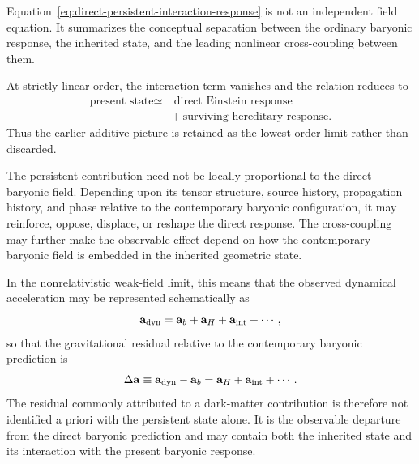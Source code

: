 Equation~\eqref{eq:direct-persistent-interaction-response} is not an independent
field equation. It summarizes the conceptual separation between the ordinary
baryonic response, the inherited state, and the leading nonlinear cross-coupling
between them.

At strictly linear order, the interaction term vanishes and the relation reduces
to
\begin{equation}
\begin{aligned}
    \text{present state}
    \simeq{}&\ \text{direct Einstein response}
    \\
    &+\ \text{surviving hereditary response}.
\end{aligned}
    \label{eq:linear-direct-plus-persistent-response}
\end{equation}
Thus the earlier additive picture is retained as the lowest-order limit rather
than discarded.

The persistent contribution need not be locally proportional to the direct
baryonic field. Depending upon its tensor structure, source history, propagation
history, and phase relative to the contemporary baryonic configuration, it may
reinforce, oppose, displace, or reshape the direct response. The cross-coupling
may further make the observable effect depend on how the contemporary baryonic
field is embedded in the inherited geometric state.

In the nonrelativistic weak-field limit, this means that the observed dynamical
acceleration may be represented schematically as
\begin{equation}
    \mathbf{a}_{\rm dyn}
    =
    \mathbf{a}_{b}
    +
    \mathbf{a}_{H}
    +
    \mathbf{a}_{\rm int}
    +
    \cdots,
    \label{eq:weak-field-acceleration-decomposition}
\end{equation}
so that the gravitational residual relative to the contemporary baryonic
prediction is
\begin{equation}
    \Delta\mathbf{a}
    \equiv
    \mathbf{a}_{\rm dyn}
    -
    \mathbf{a}_{b}
    =
    \mathbf{a}_{H}
    +
    \mathbf{a}_{\rm int}
    +
    \cdots .
    \label{eq:weak-field-hereditary-residual}
\end{equation}
The residual commonly attributed to a dark-matter contribution is therefore not
identified a priori with the persistent state alone. It is the observable
departure from the direct baryonic prediction and may contain both the inherited
state and its interaction with the present baryonic response.

